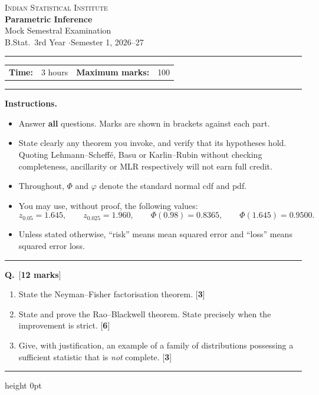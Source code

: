 \documentclass[11pt]{article}
\newcommand{\qmk}[1]{\hfill\textnormal{[\textbf{#1}]}}
\newcounter{q}
\newenvironment{question}[1]{%
  \medskip\refstepcounter{q}%
  \noindent\textbf{Q\theq.}\ \qmk{#1}\par\nopagebreak\smallskip}{\par\medskip\hrule height 0pt}
\begin{document}
\thispagestyle{empty}
\begin{center}
{\large\scshape Indian Statistical Institute}\\[10pt]
{\LARGE\bfseries Parametric Inference}\\[6pt]
{\large Mock Semestral Examination}\\[4pt]
{B.Stat.\ 3rd Year \quad$\cdot$\quad Semester 1, 2026--27}
\end{center}

\vspace{6pt}
\hrule
\vspace{6pt}

\noindent
\begin{tabular}{@{}ll@{\hspace{2.2cm}}ll@{}}
\textbf{Time:} & 3 hours & \textbf{Maximum marks:} & 100 \\
\end{tabular}

\vspace{4pt}
\hrule
\vspace{10pt}

\noindent\textbf{Instructions.}
\begin{itemize}[leftmargin=1.5em]
\item Answer \textbf{all} questions. Marks are shown in brackets against each part.
\item State clearly any theorem you invoke, and verify that its hypotheses hold. Quoting
Lehmann--Scheff\'e, Basu or Karlin--Rubin without checking completeness, ancillarity or MLR
respectively will not earn full credit.
\item Throughout, $\Phi$ and $\varphi$ denote the standard normal cdf and pdf.
\item You may use, without proof, the following values:
\[
z_{0.05}=1.645,\qquad z_{0.025}=1.960,\qquad
\Phi(0.98)=0.8365,\qquad \Phi(1.645)=0.9500 .
\]
\item Unless stated otherwise, ``risk'' means mean squared error and ``loss'' means squared
error loss.
\end{itemize}

\vspace{8pt}
\hrule
\vspace{14pt}

\begin{question}{12 marks}
\begin{enumerate}[label=(\alph*),leftmargin=2em]
\item State the Neyman--Fisher factorisation theorem. \qmk{3}
\item State and prove the Rao--Blackwell theorem. State precisely when the improvement is
strict. \qmk{6}
\item Give, with justification, an example of a family of distributions possessing a
sufficient statistic that is \emph{not} complete. \qmk{3}
\end{enumerate}
\end{question}
\end{document}
